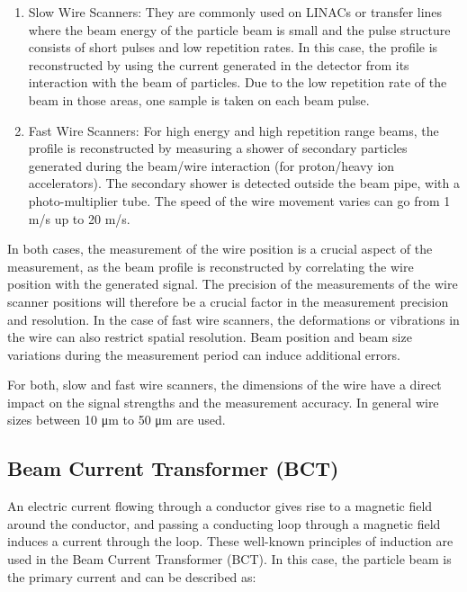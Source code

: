\begin{enumerate}
    \item Slow Wire Scanners: They are commonly used on LINACs or transfer lines where the beam energy of the particle beam is small and the pulse structure consists of short pulses and low repetition rates. In this case, the profile is reconstructed by using the current generated in the detector from its interaction with the beam of particles. Due to the low repetition rate of the beam in those areas, one sample is taken on each beam pulse.
    \item Fast Wire Scanners: For high energy and high repetition range beams, the profile is reconstructed by measuring a shower of secondary particles generated during the beam/wire interaction (for proton/heavy ion accelerators).  The secondary shower is detected outside the beam pipe, with a photo-multiplier tube. The speed of the wire movement varies can go from 1 \si[]{\metre /\second} up to 20 \si[]{\meter /\second}. 
\end{enumerate}

In both cases, the measurement of the wire position is a crucial aspect of the measurement, as the beam profile is reconstructed by correlating the wire position with the generated signal. The precision of the measurements of the wire scanner positions will therefore be a crucial factor in the measurement precision and resolution. In the case of fast wire scanners, the deformations or vibrations in the wire can also restrict spatial resolution. Beam position and beam size variations during the measurement period can induce additional errors. 

For both, slow and fast wire scanners, the dimensions of the wire have a direct impact on the signal strengths and the measurement accuracy. In general wire sizes between 10 \si[]{\micro \metre} to 50 \si[]{\micro \metre}  are used.

\subsection{Beam Current Transformer (BCT)}
\label{sec:BCT}

An electric current flowing through a conductor gives rise to a magnetic field around the conductor, and passing a conducting loop through a magnetic field induces a current through the loop. These well-known principles of induction are used in the Beam Current Transformer (BCT). In this case, the particle beam is the primary current and can be described as: 

